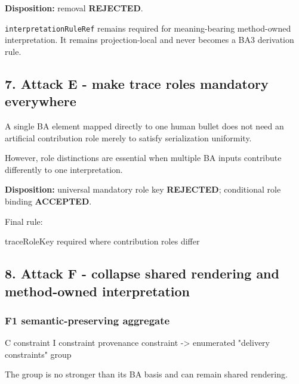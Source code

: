 \documentclass[
  11pt,
  a4paper,
]{article}
\newenvironment{Shaded}{}{}
\newcommand{\NormalTok}[1]{#1}
\begin{document}
\textbf{Disposition:} removal \textbf{REJECTED}.

\texttt{interpretationRuleRef} remains required for meaning-bearing
method-owned interpretation. It remains projection-local and never
becomes a BA3 derivation rule.

\subsection{7. Attack E - make trace roles mandatory
everywhere}\label{attack-e---make-trace-roles-mandatory-everywhere}

A single BA element mapped directly to one human bullet does not need an
artificial contribution role merely to satisfy serialization uniformity.

However, role distinctions are essential when multiple BA inputs
contribute differently to one interpretation.

\textbf{Disposition:} universal mandatory role key \textbf{REJECTED};
conditional role binding \textbf{ACCEPTED}.

Final rule:

\begin{Shaded}
\begin{Highlighting}[]
\NormalTok{traceRoleKey required where contribution roles differ}
\end{Highlighting}
\end{Shaded}

\subsection{8. Attack F - collapse shared rendering and method-owned
interpretation}\label{attack-f---collapse-shared-rendering-and-method-owned-interpretation}

\subsubsection{F1 semantic-preserving
aggregate}\label{f1-semantic-preserving-aggregate}

\begin{Shaded}
\begin{Highlighting}[]
\NormalTok{C constraint}
\NormalTok{I constraint}
\NormalTok{provenance constraint}
\NormalTok{    {-}\textgreater{} enumerated "delivery constraints" group}
\end{Highlighting}
\end{Shaded}

The group is no stronger than its BA basis and can remain shared
rendering.
\end{document}
